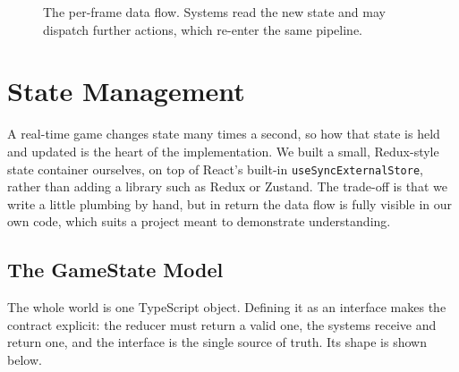 \documentclass[12pt,a4paper]{report}
\begin{document}
\begin{figure}[H]
\centering
{}
\caption{The per-frame data flow. Systems read the new state and may dispatch further actions, which re-enter the same pipeline.}
\label{fig:dataflow}
\end{figure}

\section{State Management}\label{sec:state}

A real-time game changes state many times a second, so how that state is held
and updated is the heart of the implementation. We built a small,
Redux-style state container ourselves, on top of React's built-in
\texttt{useSyncExternalStore}, rather than adding a library such as Redux or
Zustand. The trade-off is that we write a little plumbing by hand, but in return
the data flow is fully visible in our own code, which suits a project meant to
demonstrate understanding.

\subsection{The GameState Model}

The whole world is one TypeScript object. Defining it as an interface makes the
contract explicit: the reducer must return a valid one, the systems receive and
return one, and the interface is the single source of truth. Its shape is shown
below.
\end{document}
